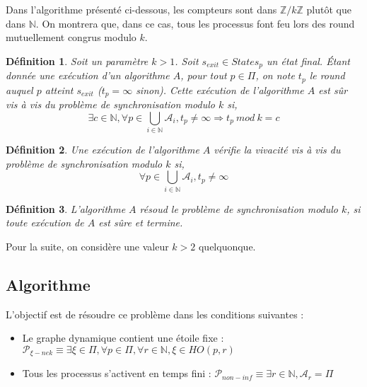 \documentclass{article}
\newtheorem{definition}{Définition}
\begin{document}
Dans l'algorithme présenté ci-dessous, les compteurs sont dans $\mathds{Z}/k\mathds{Z}$ plutôt que dans $\mathds{N}$.
On montrera que, dans ce cas, tous les processus font feu lors des round mutuellement congrus modulo $k$.

\begin{definition}

	Soit un paramètre $k > 1$. Soit $s_{exit} \in States_p$ un état final.
	Étant donnée une exécution d'un algorithme $A$, pour tout $p \in \Pi$, on note $t_p$ le round auquel $p$ atteint $s_{exit}$ ($t_p = \infty$ sinon).
	Cette exécution de l'algorithme $A$ est sûr vis à vis du problème de synchronisation modulo $k$ si,
	$$\exists c \in \mathds{N}, \forall p \in \bigcup\limits_{i \in \mathds{N}} \mathcal{A}_i, t_p \neq \infty \Rightarrow t_p~mod~k = c$$

\end{definition}

\begin{definition}

	Une exécution de l'algorithme $A$ vérifie la vivacité vis à vis du problème de synchronisation modulo $k$ si,
	$$\forall p \in \bigcup\limits_{i \in \mathds{N}} \mathcal{A}_i, t_p \neq \infty$$

\end{definition}
\begin{definition}
	L'algorithme $A$ résoud le problème de synchronisation modulo $k$, si toute exécution de $A$ est sûre et termine.
\end{definition}

Pour la suite, on considère une valeur $k > 2$ quelquonque.

\subsection{Algorithme}

L'objectif est de résoudre ce problème dans les conditions suivantes :
\begin{itemize}

	\item Le graphe dynamique contient une étoile fixe : $\mathcal{P}_{\xi-nek} \equiv \exists \xi \in \Pi, \forall p \in \Pi, \forall r \in \mathds{N}, \xi \in HO(p, r)$
	\item Tous les processus s'activent en temps fini : $\mathcal{P}_{non-inf} \equiv \exists r \in \mathds{N}, \mathcal{A}_r = \Pi$

\end{itemize}
\end{document}

